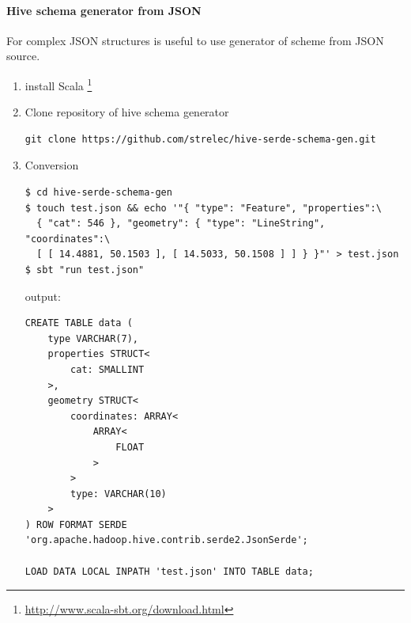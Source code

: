 \documentclass[a4paper,12pt,oneside]{report}
\begin{document}
\paragraph{Hive schema generator from JSON}
For complex JSON structures is useful to use generator of scheme from JSON
source.
\begin{enumerate}
\item install Scala \footnote{\url{http://www.scala-sbt.org/download.html}}
\item Clone repository of hive schema generator
		\begin{footnotesize}
			\begin{lstlisting}[style=python]
git clone https://github.com/strelec/hive-serde-schema-gen.git
			\end{lstlisting}
		\end{footnotesize}
\item  Conversion
		\begin{footnotesize}
			\begin{lstlisting}[style=python]
$ cd hive-serde-schema-gen
$ touch test.json && echo '"{ "type": "Feature", "properties":\
  { "cat": 546 }, "geometry": { "type": "LineString", "coordinates":\
  [ [ 14.4881, 50.1503 ], [ 14.5033, 50.1508 ] ] } }"' > test.json
$ sbt "run test.json"
			\end{lstlisting}
		\end{footnotesize}
		output:		
		\begin{footnotesize}
			\begin{lstlisting}[style=python]
CREATE TABLE data (
    type VARCHAR(7),
    properties STRUCT<
        cat: SMALLINT
    >,
    geometry STRUCT<
        coordinates: ARRAY<
            ARRAY<
                FLOAT
            >
        >
        type: VARCHAR(10)
    >
) ROW FORMAT SERDE 'org.apache.hadoop.hive.contrib.serde2.JsonSerde';

LOAD DATA LOCAL INPATH 'test.json' INTO TABLE data;
			\end{lstlisting}
		\end{footnotesize}
		
\end{enumerate}

\newpage
\end{document}
